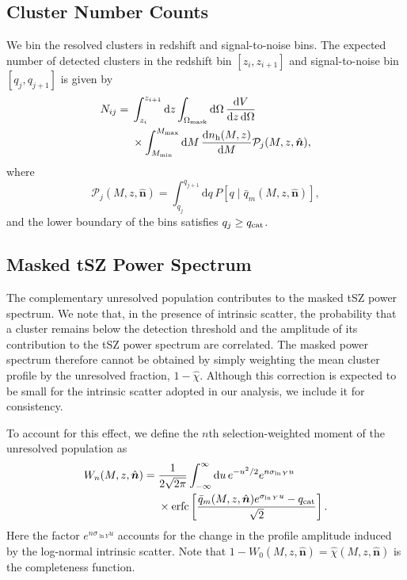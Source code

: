 \documentclass[aps,prd,twocolumn,superscriptaddress,nofootinbib,floatfix]{revtex4-2}
\begin{document}
\subsection{Cluster Number Counts}
We bin the resolved clusters in redshift and signal-to-noise bins. The expected number of detected clusters in the redshift bin
$[z_i,z_{i+1}]$ and signal-to-noise bin $[q_j,q_{j+1}]$ is given by
\begin{equation}
\begin{aligned}
N_{ij}
={}&
\int_{z_i}^{z_{i+1}}
\mathrm{d}z
\int_{\Omega_{\rm mask}}
\mathrm{d}\Omega\,
\frac{\mathrm{d}V}
{\mathrm{d}z\,\mathrm{d}\Omega}
\\
&\times
\int_{M_{\rm min}}^{M_{\rm max}}
\mathrm{d}M\,
\frac{\mathrm{d}n_{\rm h}(M,z)}
{\mathrm{d}M}
\mathcal{P}_j(M,z,\hat{\bm n}),
\end{aligned}
\label{eq:joint_cluster_counts}
\end{equation}
where
\begin{equation}
\mathcal{P}_j(M,z,\hat{\bm n})
=
\int_{q_j}^{q_{j+1}}
\mathrm{d}q\,
P\left[
q\mid\bar q_m(M,z,\hat{\bm n})
\right],
\label{eq:q_bin_probability}
\end{equation}
and the lower boundary of the bins satisfies $q_j\geq q_{\rm cat}$.

\subsection{Masked tSZ Power Spectrum}
The complementary unresolved population contributes to the masked tSZ
power spectrum. We note that, in the presence of intrinsic scatter, the probability that a cluster remains below the detection threshold and the
amplitude of its contribution to the tSZ power spectrum are correlated. The masked power spectrum therefore cannot be obtained by simply weighting the mean cluster profile by the unresolved
fraction, $1-\hat{\chi}$. Although
this correction is expected to be small for the intrinsic scatter adopted in our analysis, we include it for consistency.

To account for this effect, we define the $n$th selection-weighted moment
of the unresolved population as
\begin{equation}
\begin{aligned}
W_n(M,z,\hat{\bm n})
={}&
\frac{1}{2\sqrt{2\pi}}
\int_{-\infty}^{\infty}
\mathrm{d}u\,
e^{-u^2/2}
e^{n\sigma_{\ln Y}u}
\\
&\times
\operatorname{erfc}\left[
\frac{
\bar q_m(M,z,\hat{\bm n})
e^{\sigma_{\ln Y}u}
-q_{\rm cat}
}
{\sqrt{2}}
\right].
\end{aligned}
\label{eq:unresolved_moment_weight}
\end{equation}
Here the factor $e^{n\sigma_{\ln Y}u}$ accounts for the change in the profile amplitude induced by the log-normal intrinsic scatter. Note that $1-W_0(M,z,\hat{\bm n})=\hat{\chi}(M,z,\hat{\bm n})$
is the completeness function.
\end{document}
